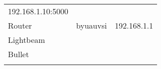 \begin{longtable}[]{@{}lll@{}}
\begin{minipage}[t]{0.30\columnwidth}
{192.168.1.10:5000}\strut
\end{minipage}\tabularnewline
\begin{minipage}[t]{0.30\columnwidth}\raggedright\strut
{Router}\strut
\end{minipage} & \begin{minipage}[t]{0.30\columnwidth}\raggedright\strut
{byuauvsi}\strut
\end{minipage} & \begin{minipage}[t]{0.30\columnwidth}\raggedright\strut
{192.168.1.1}\strut
\end{minipage}\tabularnewline
\begin{minipage}[t]{0.30\columnwidth}\raggedright\strut
{Lightbeam}\strut
\end{minipage} & \begin{minipage}[t]{0.30\columnwidth}\raggedright\strut
{}\strut
\end{minipage} & \begin{minipage}[t]{0.30\columnwidth}\raggedright\strut
{}\strut
\end{minipage}\tabularnewline
\begin{minipage}[t]{0.30\columnwidth}\raggedright\strut
{Bullet}\strut
\end{minipage} & \begin{minipage}[t]{0.30\columnwidth}\raggedright\strut
{}\strut
\end{minipage} & \begin{minipage}[t]{0.30\columnwidth}\raggedright\strut
{}\strut
\end{minipage}\tabularnewline
\begin{minipage}[t]{0.30\columnwidth}\raggedright\strut
{}\strut
\end{minipage} & \begin{minipage}[t]{0.30\columnwidth}\raggedright\strut
{}\strut
\end{minipage} & \begin{minipage}[t]{0.30\columnwidth}\raggedright\strut
{}\strut
\end{minipage}\tabularnewline
\bottomrule
\end{longtable}

{}

{}

{}

{}
